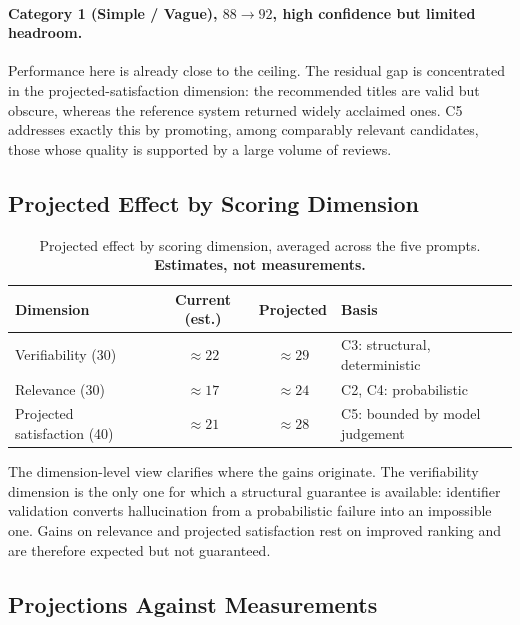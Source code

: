 \paragraph{Category 1 (Simple / Vague), $88 \rightarrow 92$, high confidence but limited headroom.}
Performance here is already close to the ceiling. The residual gap is
concentrated in the projected-satisfaction dimension: the recommended titles are
valid but obscure, whereas the reference system returned widely acclaimed ones.
C5 addresses exactly this by promoting, among comparably relevant candidates,
those whose quality is supported by a large volume of reviews.

\subsection{Projected Effect by Scoring Dimension}
\label{sec:projected-dimensions}

\begin{table}[h]
\centering
\caption{Projected effect by scoring dimension, averaged across the five
prompts. \textbf{Estimates, not measurements.}}
\label{tab:expected-dimensions}
\small
\begin{tabular}{lccl}
\hline
\textbf{Dimension} & \textbf{Current (est.)} & \textbf{Projected} & \textbf{Basis} \\
\hline
Verifiability (30)          & $\approx 22$ & $\approx 29$ & C3: structural, deterministic \\
Relevance (30)              & $\approx 17$ & $\approx 24$ & C2, C4: probabilistic \\
Projected satisfaction (40) & $\approx 21$ & $\approx 28$ & C5: bounded by model judgement \\
\hline
\end{tabular}
\end{table}

The dimension-level view clarifies where the gains originate. The verifiability
dimension is the only one for which a structural guarantee is available:
identifier validation converts hallucination from a probabilistic failure into
an impossible one. Gains on relevance and projected satisfaction rest on
improved ranking and are therefore expected but not guaranteed.

\subsection{Projections Against Measurements}
\label{sec:projection-vs-measurement}

